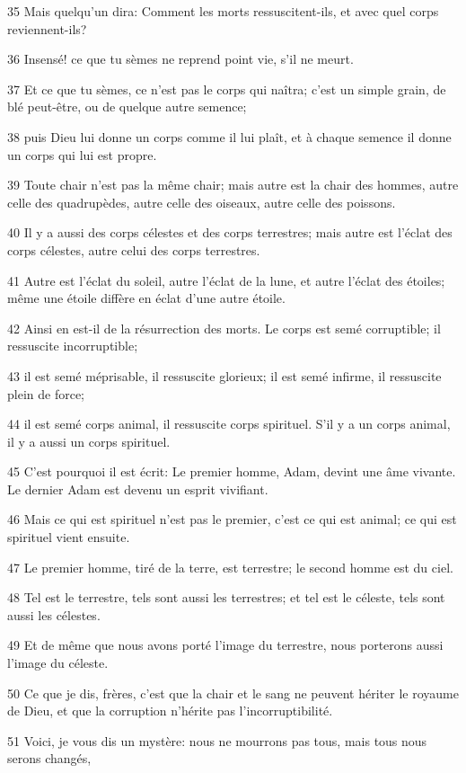 \par 35 Mais quelqu'un dira: Comment les morts ressuscitent-ils, et avec quel corps reviennent-ils?
\par 36 Insensé! ce que tu sèmes ne reprend point vie, s'il ne meurt.
\par 37 Et ce que tu sèmes, ce n'est pas le corps qui naîtra; c'est un simple grain, de blé peut-être, ou de quelque autre semence;
\par 38 puis Dieu lui donne un corps comme il lui plaît, et à chaque semence il donne un corps qui lui est propre.
\par 39 Toute chair n'est pas la même chair; mais autre est la chair des hommes, autre celle des quadrupèdes, autre celle des oiseaux, autre celle des poissons.
\par 40 Il y a aussi des corps célestes et des corps terrestres; mais autre est l'éclat des corps célestes, autre celui des corps terrestres.
\par 41 Autre est l'éclat du soleil, autre l'éclat de la lune, et autre l'éclat des étoiles; même une étoile diffère en éclat d'une autre étoile.
\par 42 Ainsi en est-il de la résurrection des morts. Le corps est semé corruptible; il ressuscite incorruptible;
\par 43 il est semé méprisable, il ressuscite glorieux; il est semé infirme, il ressuscite plein de force;
\par 44 il est semé corps animal, il ressuscite corps spirituel. S'il y a un corps animal, il y a aussi un corps spirituel.
\par 45 C'est pourquoi il est écrit: Le premier homme, Adam, devint une âme vivante. Le dernier Adam est devenu un esprit vivifiant.
\par 46 Mais ce qui est spirituel n'est pas le premier, c'est ce qui est animal; ce qui est spirituel vient ensuite.
\par 47 Le premier homme, tiré de la terre, est terrestre; le second homme est du ciel.
\par 48 Tel est le terrestre, tels sont aussi les terrestres; et tel est le céleste, tels sont aussi les célestes.
\par 49 Et de même que nous avons porté l'image du terrestre, nous porterons aussi l'image du céleste.
\par 50 Ce que je dis, frères, c'est que la chair et le sang ne peuvent hériter le royaume de Dieu, et que la corruption n'hérite pas l'incorruptibilité.
\par 51 Voici, je vous dis un mystère: nous ne mourrons pas tous, mais tous nous serons changés,
